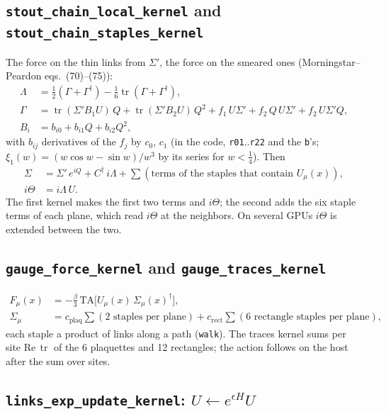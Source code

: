 \documentclass[11pt,a4paper]{article}
\numberwithin{equation}{section}
\newcommand{\code}[1]{\texttt{\small #1}}
\newcommand{\dg}{^{\dagger}}
\newcommand{\tr}{\operatorname{tr}}
\begin{document}
\subsection{\code{stout\_chain\_local\_kernel} and \code{stout\_chain\_staples\_kernel}}

The force on the thin links from $\Sigma'$, the force on the smeared ones (Morningstar–Peardon
eqs.~(70)--(75)):
\begin{align}
\Lambda &= \tfrac12(\Gamma+\Gamma\dg) - \tfrac16\tr(\Gamma+\Gamma\dg),\\
\Gamma &= \tr(\Sigma'B_1U)\,Q + \tr(\Sigma'B_2U)\,Q^2 + f_1\,U\Sigma' + f_2\,Q\,U\Sigma' + f_2\,U\Sigma'Q,\\
B_i &= b_{i0} + b_{i1}Q + b_{i2}Q^2,
\end{align}
with $b_{ij}$ derivatives of the $f_j$ by $c_0$, $c_1$ (in the code, \code{r01}..\code{r22} and the
\code{b}'s; $\xi_1(w)=(w\cos w-\sin w)/w^3$ by its series for $w<\tfrac14$). Then
\begin{align}
\Sigma &= \Sigma'\,e^{iQ} + C\dg\,i\Lambda + \sum(\text{terms of the staples that contain }U_\mu(x)),\\
i\Theta &= i\Lambda\,U .
\end{align}
The first kernel makes the first two terms and $i\Theta$; the second adds the six staple terms of
each plane, which read $i\Theta$ at the neighbors. On several GPUs $i\Theta$ is extended between
the two.

\subsection{\code{gauge\_force\_kernel} and \code{gauge\_traces\_kernel}}

\begin{align}
F_\mu(x) &= -\frac\beta3\,\mathrm{TA}\Big[U_\mu(x)\,\Sigma_\mu(x)\dg\Big],\\
\Sigma_\mu &= c_{\text{plaq}}\sum(\text{2 staples per plane}) + c_{\text{rect}}\sum(\text{6 rectangle staples per plane}),
\end{align}
each staple a product of links along a path (\code{walk}). The traces kernel sums per site
$\mathrm{Re}\,\tr$ of the 6 plaquettes and 12 rectangles; the action follows on the host after the
sum over sites.

\subsection{\code{links\_exp\_update\_kernel}: $U\leftarrow e^{\epsilon H}U$}
\end{document}
